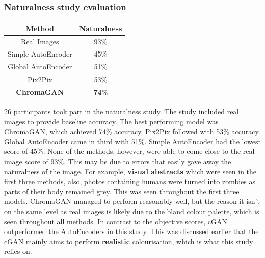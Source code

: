 \subsubsection*{Naturalness study evaluation}
\begin{center}
\begin{tabular}{||c c||} 
 \hline
  Method & Naturalness\\
 \hline
 Real Images & 93\%\\ 
 \hline
 Simple AutoEncoder & 45\%\\ 
 \hline
 Global AutoEncoder & 51\%\\
 \hline
 Pix2Pix & 53\%\\
 \hline
 \textbf{ChromaGAN} & \textbf{74}\%\\
 \hline
\end{tabular}
\end{center}
26 participants took part in the naturalness study. The study included real images to provide baseline accuracy. The best performing model was ChromaGAN, which achieved 74\% accuracy. Pix2Pix followed with 53\% accuracy. Global AutoEncoder came in third with 51\%. Simple AutoEncoder had the lowest score of 45\%. None of the methods, however, were able to come close to the real image score of 93\%. This may be due to errors that easily gave away the naturalness of the image. For example, \textbf{visual abstracts} which were seen in the first three methods, also, photos containing humans were turned into zombies as parts of their body remained grey. This was seen throughout the first three models. ChromaGAN managed to perform reasonably well, but the reason it isn't on the same level as real images is likely due to the bland colour palette, which is seen throughout all methods. In contrast to the objective scores, cGAN outperformed the AutoEncoders in this study. This was discussed earlier that the cGAN mainly aims to perform \textbf{realistic} colourisation, which is what this study relies on.



